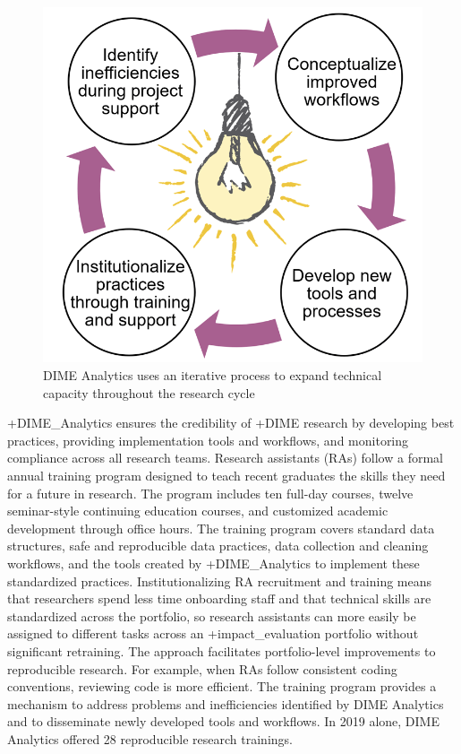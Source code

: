 \documentclass[
]{WileySix}
\begin{document}
\begin{figure}
\includegraphics[width=1\linewidth]{./assets/dime/dimefigure3web} \caption{DIME Analytics uses an iterative process to expand technical capacity throughout the research cycle}\label{fig:dimefigure3}
\end{figure}

+DIME\_Analytics\textbar{} ensures the credibility of +DIME\textbar{} research by developing best practices, providing implementation tools and workflows, and monitoring compliance across all research teams. Research assistants (RAs) follow a formal annual training program designed to teach recent graduates the skills they need for a future in research. The program includes ten full-day courses, twelve seminar-style continuing education courses, and customized academic development through office hours. The training program covers standard data structures, safe and reproducible data practices, data collection and cleaning workflows, and the tools created by +DIME\_Analytics\textbar{} to implement these standardized practices. Institutionalizing RA recruitment and training means that researchers spend less time onboarding staff and that technical skills are standardized across the portfolio, so research assistants can more easily be assigned to different tasks across an +impact\_evaluation\textbar{} portfolio without significant retraining. The approach facilitates portfolio-level improvements to reproducible research. For example, when RAs follow consistent coding conventions, reviewing code is more efficient. The training program provides a mechanism to address problems and inefficiencies identified by DIME Analytics and to disseminate newly developed tools and workflows. In 2019 alone, DIME Analytics offered 28 reproducible research trainings.
\end{document}
